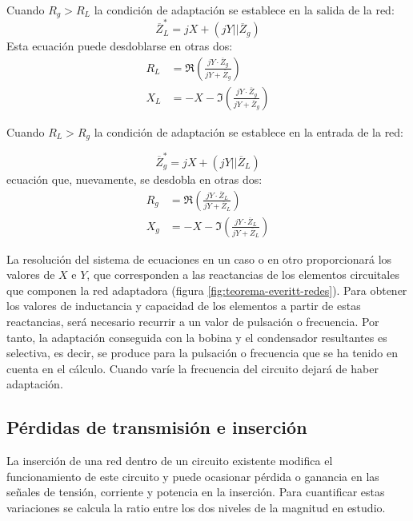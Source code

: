 Cuando $R_g > R_L$ la condición de adaptación se establece en la
salida de la red:
\begin{equation}
  \overline{Z}^*_L = jX + (jY || \overline{Z}_g) 
\end{equation}
Esta ecuación puede desdoblarse en otras dos:
\begin{align}
  R_L &= \Re\left(\frac{jY \cdot \overline{Z}_g}{jY + \overline{Z}_g}\right)\\
  X_L &= -X - \Im\left(\frac{jY \cdot \overline{Z}_g}{jY + \overline{Z}_g}\right)
\end{align}

Cuando $R_L > R_g$ la condición de adaptación se establece en la
entrada de la red:

\begin{equation}
  \overline{Z}^*_g = jX + (jY || \overline{Z}_L) 
\end{equation}
ecuación que, nuevamente, se desdobla en otras dos:
\begin{align}
  R_g &= \Re\left(\frac{jY \cdot \overline{Z}_L}{jY + \overline{Z}_L}\right)\\
  X_g &= -X - \Im\left(\frac{jY \cdot \overline{Z}_L}{jY + \overline{Z}_L}\right)
\end{align}

La resolución del sistema de ecuaciones en un caso o en otro
proporcionará los valores de $X$ e $Y$, que corresponden a las
reactancias de los elementos circuitales que componen la red
adaptadora (figura \ref{fig:teorema-everitt-redes}). Para obtener los
valores de inductancia y capacidad de los elementos a partir de estas
reactancias, será necesario recurrir a un valor de pulsación o
frecuencia. Por tanto, la adaptación conseguida con la bobina y el
condensador resultantes es selectiva, es decir, se produce para la
pulsación o frecuencia que se ha tenido en cuenta en el
cálculo. Cuando varíe la frecuencia del circuito dejará de haber
adaptación.

\subsection{Pérdidas de transmisión e inserción}
\label{sec:everitt-perdidas}

La inserción de una red dentro de un circuito existente modifica el
funcionamiento de este circuito y puede ocasionar pérdida o ganancia
en las señales de tensión, corriente y potencia en la inserción. Para
cuantificar estas variaciones se calcula la ratio entre los dos
niveles de la magnitud en estudio.

